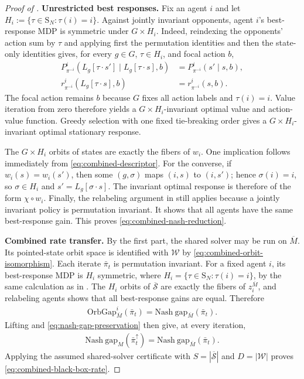\documentclass{article}
\theoremstyle{plain}
\theoremstyle{definition}
\theoremstyle{remark}
\newcommand{\Nash}{\mathrm{Nash\ gap}}
\newcommand{\St}{\mathcal{S}}
\newcommand{\abs}[1]{\left\lvert#1\right\rvert}
\newcommand{\quotient}[1]{\overline{#1}}
\newcommand{\Sym}{\mathrm{S}}
\begin{document}
\begin{proof}[Proof of ]
\medskip\noindent\textbf{Unrestricted best responses.}
Fix an agent $i$ and let
$H_i:=\{\tau\in\Sym_N:\tau(i)=i\}$. Against jointly invariant opponents,
agent $i$'s best-response MDP is symmetric under $G\times H_i$. Indeed,
reindexing the opponents' action sum by $\tau$ and applying first the
permutation identities and then the state-only identities gives, for every
$g\in G$, $\tau\in H_i$, and focal action $b$,
\begin{align*}
  P^i_{\pi^{-i}}\!\left(
    L_g[\tau\mathbin{\cdot}s']
    \mid
    L_g[\tau\mathbin{\cdot}s],b
  \right)
  &=
  P^i_{\pi^{-i}}(s'\mid s,b),\\
  r^i_{\pi^{-i}}\!\left(
    L_g[\tau\mathbin{\cdot}s],b
  \right)
  &=
  r^i_{\pi^{-i}}(s,b).
\end{align*}
The focal action remains $b$ because $G$ fixes all action labels and
$\tau(i)=i$. Value iteration from zero therefore yields a
$G\times H_i$-invariant optimal value and action-value function. Greedy
selection with one fixed tie-breaking order gives a
$G\times H_i$-invariant optimal stationary response.

The $G\times H_i$ orbits of states are exactly the fibers of $w_i$.
One implication follows immediately from \eqref{eq:combined-descriptor}. For
the converse, if $w_i(s)=w_i(s')$, then some $(g,\sigma)$ maps
$(i,s)$ to $(i,s')$; hence $\sigma(i)=i$, so $\sigma\in H_i$ and
$s'=L_g[\sigma\mathbin{\cdot}s]$. The invariant optimal response is therefore
of the form $\chi\circ w_i$. Finally, the relabeling argument in
 still applies because a jointly invariant
policy is permutation invariant. It shows that all agents have the same
best-response gain. This proves \eqref{eq:combined-nash-reduction}.

\medskip\noindent\textbf{Combined rate transfer.}
By the first part, the shared solver may be run on $\quotient M$. Its
pointed-state orbit space is identified with $\mathcal W$ by
\eqref{eq:combined-orbit-isomorphism}. Each iterate $\bar\pi_t$ is
permutation invariant. For a fixed agent $i$, its best-response MDP is
$H_i$ symmetric, where
$H_i=\{\tau\in\Sym_N:\tau(i)=i\}$, by the same calculation as in
. The $H_i$ orbits
of $\quotient\St$ are exactly the fibers of
$z_i^{\quotient M}$, and relabeling agents shows that all best-response
gains are equal. Therefore
\begin{align*}
  \mathrm{OrbGap}_{\quotient M}^i(\bar\pi_t)
  =
  \Nash_{\quotient M}(\bar\pi_t).
\end{align*}
Lifting and
\eqref{eq:nash-gap-preservation} then give, at every iteration,
\begin{align*}
  \Nash_M(\bar\pi_t^\uparrow)
  =
  \Nash_{\quotient M}(\bar\pi_t).
\end{align*}
Applying the assumed shared-solver certificate with
$S=\abs{\quotient\St}$ and $D=\abs{\mathcal W}$ proves
\eqref{eq:combined-black-box-rate}.


\end{proof}
\end{document}
